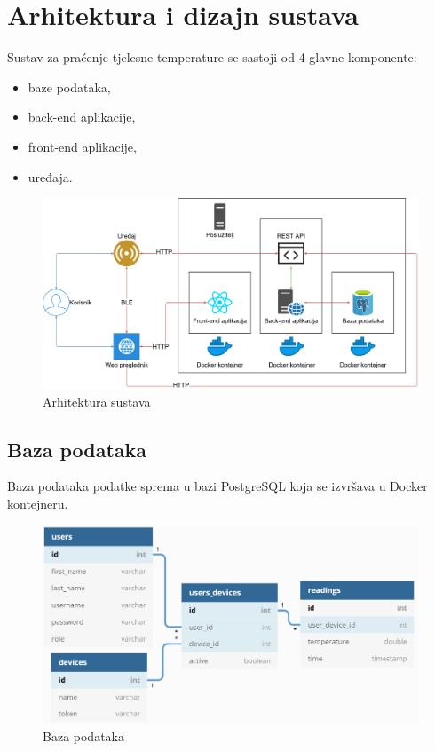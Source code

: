 \documentclass[times, utf8, diplomski]{fer}
\begin{document}
\section{Arhitektura i dizajn sustava}
Sustav za praćenje tjelesne temperature se sastoji od 4 glavne komponente: 
\begin{itemize}
    \item baze podataka,
    \item back-end aplikacije,
    \item front-end aplikacije,
    \item uređaja.
\end{itemize}
\begin{figure}[H]
    \centering
    \includegraphics[width=14.5cm]{images/arh.png}
    \caption{Arhitektura sustava}
    \label{fig:architecture}
\end{figure}

\subsection{Baza podataka}
Baza podataka podatke sprema u bazi PostgreSQL koja se izvršava u Docker kontejneru.
\begin{figure}[H]
    \centering
    \includegraphics[width=14.5cm]{images/baza.png}
    \caption{Baza podataka}
    \label{fig:baza}
\end{figure}
\end{document}
